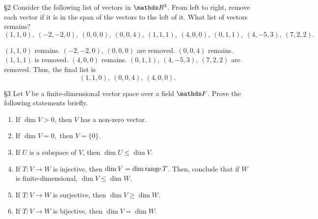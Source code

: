 \documentclass{review-sheet}
\begin{document}
\begin{problem}{\S 2}
  Consider the following list of vectors in $\R^3$. From left to right, remove each vector if it is
  in the span of the vectors to the left of it. What list of vectors remains?
  \[
    (1,1,0),\ (-2,-2,0),\ (0,0,0),\ (0,0,4),\ (1,1,1),\ (4,0,0),\ (0,1,1),\ (4,-5,3),\ (7,2,2)
  .\] 
\end{problem}
\begin{solution}
  $(1,1,0)$ remains. $(-2,-2,0),\ (0,0,0)$ are removed. $(0,0,4)$ remains. $(1,1,1)$ is removed.
  $(4,0,0)$ remains. $(0,1,1),\ (4,-5,3),\ (7,2,2)$ are removed. Thus, the final list is \[
    (1,1,0),\ (0,0,4),\ (4,0,0)
  .\] 
\end{solution}

\begin{problem}{\S 3}
  Let $V$ be a finite-dimensional vector space over a field $\F$. Prove the following statements
  briefly.
  \begin{enumerate}[label=(\alph*)]
    \item If $\dim{V}>0$, then $V$ has a non-zero vector.
    \item If $\dim{V}=0,$ then $V=\{ 0 \}$.
    \item If $U$ is a subspace of $V$, then $\dim{U}\le \dim{V}$.
    \item If $T:V\to W$ is injective, then $\dim{V}=\dim{\operatorname{range}{T}}$. Then, conclude that if $W$ is
      finite-dimensional, $\dim V \le \dim W$.
    \item If $T:V\to W$ is surjective, then $\dim V \ge \dim W$.
    \item If $T:V\to W$ is bijective, then $\dim V = \dim W$.
  \end{enumerate}
\end{problem}
\end{document}
